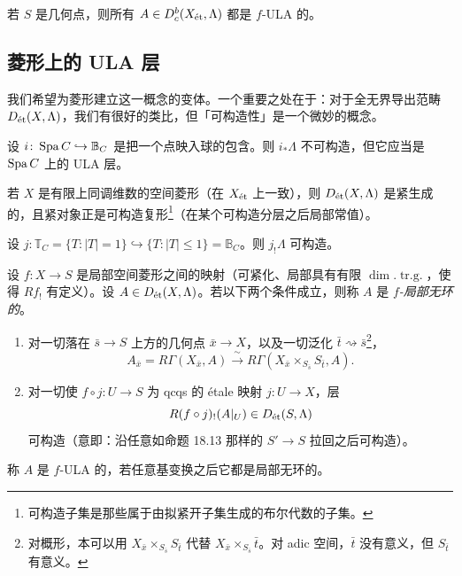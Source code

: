 \begin{example}
若 $S$ 是几何点，则所有 $A\in D^b_c(X_{\et},\Lambda)$ 都是 $f$-ULA 的。
\end{example}

\subsection{菱形上的 ULA 层}

我们希望为菱形建立这一概念的变体。一个重要之处在于：对于全无界导出范畴 $D_{\et}(X,\Lambda)$，我们有很好的类比，但「可构造性」是一个微妙的概念。

\begin{example}
设 $i\colon\Spa C\hookrightarrow\mathbb B_C$ 是把一个点映入球的包含。则 $i_*\Lambda$ 不可构造，但它应当是 $\Spa C$ 上的 ULA 层。
\end{example}

\begin{proposition}
若 $X$ 是有限上同调维数的空间菱形（在 $X_{\et}$ 上一致），则 $D_{\et}(X,\Lambda)$ 是紧生成的，且紧对象正是可构造复形\footnote{可构造子集是那些属于由拟紧开子集生成的布尔代数的子集。}（在某个可构造分层之后局部常值）。
\end{proposition}

\begin{example}
设 $j\colon\mathbb T_C=\{T:|T|=1\}\hookrightarrow\{T:|T|\le1\}=\mathbb B_C$。则 $j_!\Lambda$ 可构造。
\end{example}

\begin{definition}
设 $f\colon X\to S$ 是局部空间菱形之间的映射（可紧化、局部具有有限 $\dim.\operatorname{tr.g.}$，使得 $Rf_!$ 有定义）。设 $A\in D_{\et}(X,\Lambda)$。若以下两个条件成立，则称 $A$ 是 \emph{$f$-局部无环的}。
\begin{enumerate}[label=(\arabic*)]
\item 对一切落在 $\bar s\to S$ 上方的几何点 $\bar x\to X$，以及一切泛化 $\bar t\rightsquigarrow\bar s$\footnote{对概形，本可以用 $X_{\bar x}\times_{S_{\bar s}}S_{\bar t}$ 代替 $X_{\bar x}\times_{S_{\bar s}}\bar t$。对 adic 空间，$\bar t$ 没有意义，但 $S_{\bar t}$ 有意义。}，
\[
A_{\bar x}=R\Gamma(X_{\bar x},A)\xrightarrow{\ \sim\ }R\Gamma(X_{\bar x}\times_{S_{\bar s}}S_{\bar t},A).
\]
\item 对一切使 $f\circ j\colon U\to S$ 为 qcqs 的 étale 映射 $j\colon U\to X$，层
\[
R(f\circ j)_!(A|_U)\in D_{\et}(S,\Lambda)
\]
可构造（意即：沿任意如命题 18.13 那样的 $S'\to S$ 拉回之后可构造）。
\end{enumerate}
称 $A$ 是 $f$-ULA 的，若任意基变换之后它都是局部无环的。
\end{definition}

